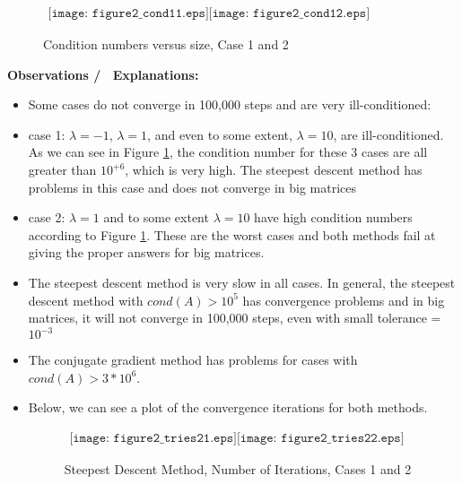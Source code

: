 \begin{figure}[H]
    \centering
    $\begin{array}{cc}
        \texttt{[image: figure2\_cond11.eps]} 
        \texttt{[image: figure2\_cond12.eps]} 
    \end{array}$        
    \caption{Condition numbers versus size, Case 1 and 2 }
    \label{fig:fig2CG5}
\end{figure}

{\LARGE \textbf{Observations \slash~  Explanations:}}

\begin{itemize}

\item Some cases do not converge in 100,000 steps and are very ill-conditioned: 

\item case 1: $\lambda=-1$, $\lambda=1$, and even to some extent, $\lambda=10$, are ill-conditioned. As we can see in Figure \ref{fig:fig2CG5}, the condition number for these 3 cases are all greater than $10^{+6}$, which is very high. The steepest descent method has problems in this case and does not converge in big matrices

\item case 2: $\lambda=1$ and to some extent $\lambda=10$ have high condition numbers according to Figure \ref{fig:fig2CG5}. These are the worst cases and both methods fail at giving the proper answers for big matrices.

\item The steepest descent method is very slow in all cases. In general, the steepest descent method with $cond(A)>10^5$ has convergence problems and in big matrices, it will not converge in 100,000 steps, even with small tolerance =$10^{-3}$

\item The conjugate gradient method has problems for cases with $cond(A)>3*10^{6}$.

\item Below, we can see a plot of the convergence iterations for both methods.


\begin{figure}[H]
    \centering
    $\begin{array}{cc}
        \texttt{[image: figure2\_tries21.eps]} 
        \texttt{[image: figure2\_tries22.eps]} 
    \end{array}$        
    \caption{Steepest Descent Method, Number of Iterations,  Cases 1 and 2 }
    \label{fig:fig2SDtries}
\end{figure}


\end{itemize}
